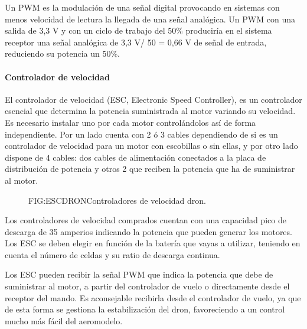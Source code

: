  
 Un PWM es la modulación de una señal digital provocando en sistemas con menos velocidad de lectura la llegada de una señal analógica. Un PWM con una salida de 3,3 V y con un ciclo de trabajo del 50\% produciría en el sistema receptor una señal analógica de 3,3 V/ 50 = 0,66 V de señal de entrada, reduciendo su potencia un 50\%.

 
 \paragraph{Controlador de velocidad}
 \label{SSS:Controlador de velocidad}
 


 El controlador de velocidad (ESC, Electronic Speed Controller), es un controlador esencial que determina la potencia suministrada al motor variando su velocidad. Es necesario instalar uno por cada motor controlándolos así de forma independiente.
 Por un lado cuenta con 2 ó 3 cables dependiendo de si es un controlador de velocidad para un motor con escobillas o sin ellas, y por otro lado dispone de 4 cables: dos cables de alimentación conectados a la placa de distribución de potencia y otros 2 que reciben la potencia que ha de suministrar al motor.
 
 \begin{figure}[Controlador de velocidad]{FIG:ESCDRON}{Controladores de velocidad dron.}
\end{figure}
 
 Los controladores de velocidad comprados cuentan con una capacidad pico de descarga de 35 amperios indicando la potencia que pueden generar los motores. Los ESC se deben elegir en función de la batería que vayas a utilizar, teniendo en cuenta el número de celdas y su ratio de descarga continua.
 
 Los ESC pueden recibir la señal PWM que indica la potencia que debe de suministrar al motor, a partir del controlador de vuelo o directamente desde el receptor del mando. Es aconsejable recibirla desde el controlador de vuelo, ya que de esta forma se gestiona la estabilización del dron, favoreciendo a un control mucho más fácil del aeromodelo. \cite{OscarSerrano}

